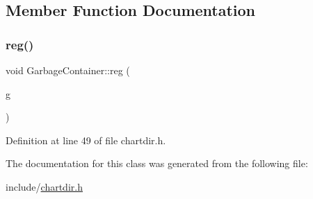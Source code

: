 \subsection{Member Function Documentation}
\mbox{\label{class_garbage_container_a5612b22ee7b0e0ac3a2f346b89535c33}} 
\subsubsection{\texorpdfstring{reg()}{reg()}}
{\footnotesize\ttfamily void Garbage\+Container\+::reg (\begin{DoxyParamCaption}\item[{\hyperlink{class_auto_destroy}{Auto\+Destroy} $\ast$}]{g }\end{DoxyParamCaption})\hspace{0.3cm}{\ttfamily [inline]}}



Definition at line 49 of file chartdir.\+h.



The documentation for this class was generated from the following file\+:\begin{DoxyCompactItemize}
\item 
include/\hyperlink{chartdir_8h}{chartdir.\+h}\end{DoxyCompactItemize}
